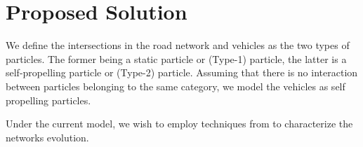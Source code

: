 \documentclass[a4paper,12pt]{scrartcl}
\begin{document}
\section*{Proposed Solution}

We define the intersections in the road network and vehicles as the two types of particles. The former being a static particle or (Type-1) particle, the latter is a self-propelling particle or (Type-2) particle. Assuming that there is no interaction between particles belonging to the same category, we model the vehicles as self propelling particles.

Under the current model, we wish to employ techniques from \cite{ChengCoRR2017} to characterize the networks evolution.      




    
\end{document}
